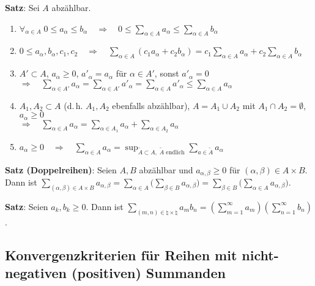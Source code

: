 \textbf{Satz}: Sei $A$ abzählbar.
\begin{enumerate}
    \item $\forall_{\alpha \in A}\; 0 \le a_\alpha \le b_\alpha
    \quad\Rightarrow\quad
    0 \le \sum_{\alpha \in A} a_\alpha \le \sum_{\alpha \in A} b_\alpha$

    \item $0 \le a_\alpha, b_\alpha, c_1, c_2
    \quad\Rightarrow\quad
    \sum_{\alpha \in A} (c_1 a_\alpha + c_2 b_\alpha) =
    c_1 \sum_{\alpha \in A} a_\alpha + c_2 \sum_{\alpha \in A} b_\alpha$

    \item $A' \subset A$, \quad $a_\alpha \ge 0$, \quad
    $a'_\alpha = a_\alpha$ für $\alpha \in A'$,
    sonst $a'_\alpha = 0$ \\
    $\Rightarrow\quad \sum_{\alpha \in A'} a_\alpha
    = \sum_{\alpha \in A'} a'_\alpha
    = \sum_{\alpha \in A} a'_\alpha
    \le \sum_{\alpha \in A} a_\alpha$

    \item $A_1, A_2 \subset A$ (d.\,h. $A_1, A_2$ ebenfalls abzählbar), \quad
    $A = A_1 \cup A_2$ mit $A_1 \cap A_2 = \emptyset$, \quad
    $a_\alpha \ge 0$ \\
    $\Rightarrow\quad \sum_{\alpha \in A} a_\alpha =
    \sum_{\alpha \in A_1} a_\alpha + \sum_{\alpha \in A_2} a_\alpha$

    \item $a_\alpha \ge 0
    \quad\Rightarrow\quad \sum_{\alpha \in A} a_\alpha =
    \sup_{\widetilde{A} \subset A,\; \widetilde{A} \text{ endlich}}
    \sum_{a \in \widetilde{A}} a_\alpha$
\end{enumerate}

\linie

\textbf{Satz (Doppelreihen)}:
Seien $A, B$ abzählbar und $a_{\alpha,\beta} \ge 0$ für
$(\alpha,\beta) \in A \times B$. \\
Dann ist $\sum_{(\alpha,\beta) \in A \times B} a_{\alpha,\beta} =
\sum_{\alpha \in A} \Big(\sum_{\beta \in B} a_{\alpha,\beta}\Big) =
\sum_{\beta \in B} \Big(\sum_{\alpha \in A} a_{\alpha,\beta}\Big)$.

\textbf{Satz}:
Seien $a_k, b_k \ge 0$.
Dann ist $\sum_{(m,n) \in \natural \times \natural} a_m b_n =
\left(\sum_{m=1}^\infty a_m\right) \left(\sum_{n=1}^\infty b_n\right)$.

\subsection{%
    Konvergenzkriterien für Reihen mit nicht-negativen (positiven)
    Summanden%
}

